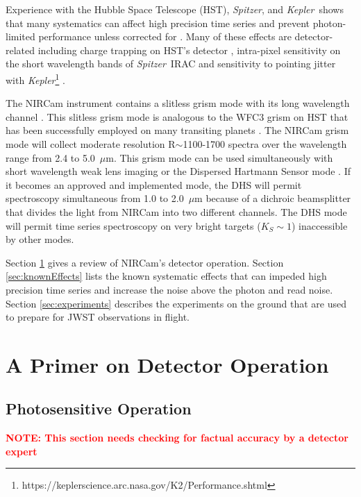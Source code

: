 \documentclass{aastex62}
\newcommand{\spitzer}{{\it Spitzer}}
\newcommand{\kepler}{{\it Kepler}}
\begin{document}
Experience with the Hubble Space Telescope (HST), \spitzer, and \kepler\ shows that many systematics can affect high precision time series and prevent photon-limited performance unless corrected for \citep[e.g.][]{beichman2014pasp}.
Many of these effects are detector-related including charge trapping on HST's detector \citep{berta2012flat_gj1214,zhou2017chargeTrap}, intra-pixel sensitivity on the short wavelength bands of \spitzer\ IRAC \citep{moralesCalderon2006LdwarfsWeatherIPC} and sensitivity to pointing jitter with \kepler\footnote{https://keplerscience.arc.nasa.gov/K2/Performance.shtml} \citep{beichman2014pasp}.

The NIRCam instrument \citep{rieke2005nircamSPIE} contains a slitless grism mode with its long wavelength channel \citep{greene2017jatisNIRCam}.
This slitless grism mode is analogous to the WFC3 grism on HST that has been successfully employed on many transiting planets \citep[e.g.][]{deming13,kreidberg2014wasp43,sing2016continuum,wakeford2017hatp26}.
The NIRCam grism mode will collect moderate resolution R$\sim$1100-1700 spectra over the wavelength range from 2.4 to 5.0~$\mu$m.
This grism mode can be used simultaneously with short wavelength weak lens imaging or the Dispersed Hartmann Sensor mode \citep{schlawin2017dhs}. If it becomes an approved and implemented mode, the DHS will permit spectroscopy simultaneous from 1.0 to 2.0~$\mu$m because of a dichroic beamsplitter that divides the light from NIRCam into two different channels.
The DHS mode will permit time series spectroscopy on very bright targets ($K_S \sim 1$) inaccessible by other modes.

Section \ref{sec:detectorPrimer} gives a review of NIRCam's detector operation.
Section \ref{sec:knownEffects} lists the known systematic effects that can impeded high precision time series and increase the noise above the photon and read noise.
Section \ref{sec:experiments} describes the experiments on the ground that are used to prepare for JWST observations in flight.


\section{A Primer on Detector Operation}\label{sec:detectorPrimer}

\subsection{Photosensitive Operation}
\textcolor{red}{\textbf{NOTE: This section needs checking for factual accuracy by a detector expert}}
\end{document}
